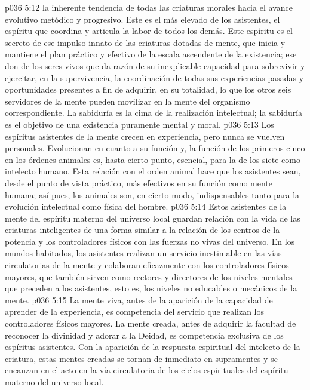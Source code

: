 \vs p036 5:12  la inherente tendencia de todas las criaturas morales hacia el avance evolutivo metódico y progresivo. Este es el más elevado de los asistentes, el espíritu que coordina y articula la labor de todos los demás. Este espíritu es el secreto de ese impulso innato de las criaturas dotadas de mente, que inicia y mantiene el plan práctico y efectivo de la escala ascendente de la existencia; ese don de los seres vivos que da razón de su inexplicable capacidad para sobrevivir y ejercitar, en la supervivencia, la coordinación de todas sus experiencias pasadas y oportunidades presentes a fin de adquirir, en su totalidad, lo que los otros seis servidores de la mente pueden movilizar en la mente del organismo correspondiente. La sabiduría es la cima de la realización intelectual; la sabiduría es el objetivo de una existencia puramente mental y moral.
\vs p036 5:13 \pc Los espíritus asistentes de la mente crecen en experiencia, pero nunca se vuelven personales. Evolucionan en cuanto a su función y, la función de los primeros cinco en los órdenes animales es, hasta cierto punto, esencial, para la de los siete como intelecto humano. Esta relación con el orden animal hace que los asistentes sean, desde el punto de vista práctico, más efectivos en su función como mente humana; así pues, los animales son, en cierto modo, indispensables tanto para la evolución intelectual como física del hombre.
\vs p036 5:14 Estos asistentes de la mente del espíritu materno del universo local guardan relación con la vida de las criaturas inteligentes de una forma similar a la relación de los centros de la potencia y los controladores físicos con las fuerzas no vivas del universo. En los mundos habitados, los asistentes realizan un servicio inestimable en las vías circulatorias de la mente y colaboran eficazmente con los controladores físicos mayores, que también sirven como rectores y directores de los niveles mentales que preceden a los asistentes, esto es, los niveles no educables o mecánicos de la mente.
\vs p036 5:15 La mente viva, antes de la aparición de la capacidad de aprender de la experiencia, es competencia del servicio que realizan los controladores físicos mayores. La mente creada, antes de adquirir la facultad de reconocer la divinidad y adorar a la Deidad, es competencia exclusiva de los espíritus asistentes. Con la aparición de la respuesta espiritual del intelecto de la criatura, estas mentes creadas se tornan de inmediato en supramentes y se encauzan en el acto en la vía circulatoria de los ciclos espirituales del espíritu materno del universo local.
